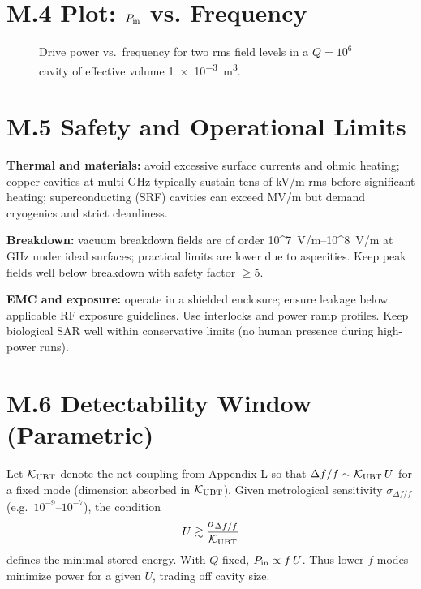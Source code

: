 \documentclass[12pt]{article}
\begin{document}
\section*{M.4 Plot: $P_{\rm in}$ vs. Frequency}
\begin{figure}[h!]
\centering
{}
\caption{Drive power vs.\ frequency for two rms field levels in a $Q=10^6$ cavity of effective volume \SI{1e-3}{m^3}.}
\end{figure}

\section*{M.5 Safety and Operational Limits}
\textbf{Thermal and materials:} avoid excessive surface currents and ohmic heating; copper cavities at multi-GHz typically sustain tens of kV/m rms before significant heating; superconducting (SRF) cavities can exceed MV/m but demand cryogenics and strict cleanliness.
\medskip

\noindent\textbf{Breakdown:} vacuum breakdown fields are of order \SI{10^7}{V/m}--\SI{10^8}{V/m} at GHz under ideal surfaces; practical limits are lower due to asperities. Keep peak fields well below breakdown with safety factor $\ge 5$.
\medskip

\noindent\textbf{EMC and exposure:} operate in a shielded enclosure; ensure leakage below applicable RF exposure guidelines. Use interlocks and power ramp profiles. Keep biological SAR well within conservative limits (no human presence during high-power runs).

\section*{M.6 Detectability Window (Parametric)}
Let $\mathcal{K}_{\rm UBT}$ denote the net coupling from Appendix L so that $\Delta f/f \sim \mathcal{K}_{\rm UBT}\, U$ for a fixed mode (dimension absorbed in $\mathcal{K}_{\rm UBT}$).
Given metrological sensitivity $\sigma_{\Delta f/f}$ (e.g.\ $10^{-9}$--$10^{-7}$), the condition
\begin{equation}
U \gtrsim \frac{\sigma_{\Delta f/f}}{\mathcal{K}_{\rm UBT}}
\end{equation}
defines the minimal stored energy. With $Q$ fixed, $P_{\rm in}\propto f\,U$. Thus lower-$f$ modes minimize power for a given $U$, trading off cavity size.
\end{document}
